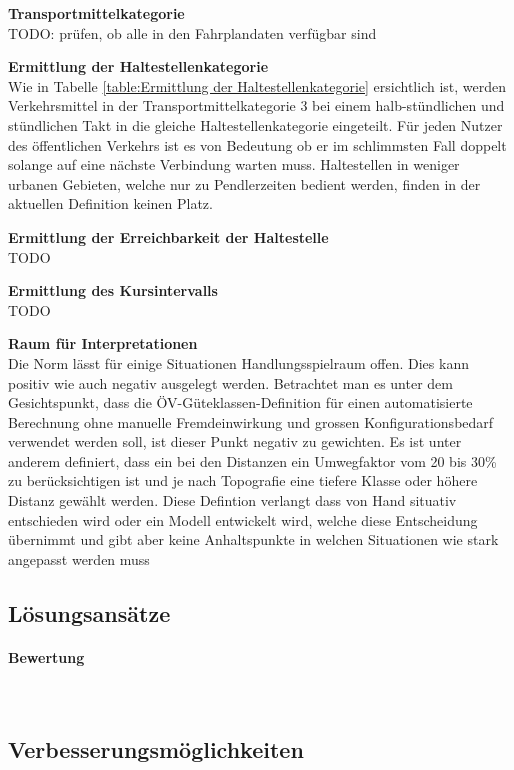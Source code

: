 \textbf{Transportmittelkategorie}\\
TODO: prüfen, ob alle in den Fahrplandaten verfügbar sind

\textbf{Ermittlung der Haltestellenkategorie}\\
Wie in Tabelle \ref{table:Ermittlung der Haltestellenkategorie} ersichtlich ist, werden Verkehrsmittel in der Transportmittelkategorie 3 bei einem halb-stündlichen und stündlichen Takt in die gleiche Haltestellenkategorie eingeteilt.
Für jeden Nutzer des öffentlichen Verkehrs ist es von Bedeutung ob er im schlimmsten Fall doppelt solange auf eine nächste Verbindung warten muss.
Haltestellen in weniger urbanen Gebieten, welche nur zu Pendlerzeiten bedient werden, finden in der aktuellen Definition keinen Platz.

\textbf{Ermittlung der Erreichbarkeit der Haltestelle}\\
TODO

\textbf{Ermittlung des Kursintervalls}\\
TODO

\textbf{Raum für Interpretationen}\\
Die Norm lässt für einige Situationen Handlungsspielraum offen.
Dies kann positiv wie auch negativ ausgelegt werden.
Betrachtet man es unter dem Gesichtspunkt, dass die \acs{ÖV}-Güteklassen-Definition für einen automatisierte Berechnung ohne manuelle Fremdeinwirkung und grossen Konfigurationsbedarf verwendet werden soll, ist dieser Punkt negativ zu gewichten.
Es ist unter anderem definiert, dass ein bei den Distanzen ein Umwegfaktor vom 20 bis 30\% zu berücksichtigen ist und je nach Topografie eine tiefere Klasse oder höhere Distanz gewählt werden.
Diese Defintion verlangt dass von Hand situativ entschieden wird oder ein Modell entwickelt wird, welche diese Entscheidung übernimmt und gibt aber keine Anhaltspunkte in welchen Situationen wie stark angepasst werden muss

\subsection{Lösungsansätze}
\label{Stand der Technik:Lösungsansätze}


\paragraph{Bewertung}~\\


\subsection{Verbesserungsmöglichkeiten}
\label{Stand der Technik:Verbesserungsmöglichkeiten}

